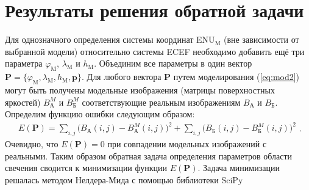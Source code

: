 \documentclass[12pt,a4paper]{article}
\renewcommand{\vec}{\mathbf}
\begin{document}
\section{Результаты решения обратной задачи} \label{sec:inv_problem_results}
Для однозначного определения системы координат ENU$_\text{M}$ (вне зависимости от выбранной модели) относительно системы ECEF необходимо добавить ещё три параметра $\varphi_\text{M}$, $\lambda_\text{M}$ и $h_\text{M}$. Объединим все параметры в один вектор $\vec{P}=\{\varphi_\text{M}, \lambda_\text{M}, h_\text{M}, \vec{p}\}$. Для любого вектора $\vec{P}$ путем моделирования (\ref{eq:mod2}) могут быть получены модельные изображения (матрицы поверхностных яркостей) $B_\text{А}^M$ и $B_\text{Б}^M$ соответствующие реальным изображениям $B_\text{А}$ и $B_\text{Б}$. Определим функцию ошибки следующим образом:
\begin{equation}\label{eq:task1}
\begin{split}
E(\vec{P})=\sum_{i,j}\big(B_{\text{А}}(i,j)-B_{\text{А}}^M(i,j)\big)^2+\sum_{i,j}\big(B_{\text{Б}}(i,j)-B_{\text{Б}}^M(i,j)\big)^2
\end{split}.
\end{equation}
Очевидно, что $E(\vec{P})=0$ при совпадении модельных изображений с реальными. Таким образом обратная задача определения параметров области свечения сводится к минимизации функции $E(\vec{P})$. Задача минимизации решалась методом Нелдера-Мида с помощью библиотеки SciPy \cite{SciPy}
\end{document}

